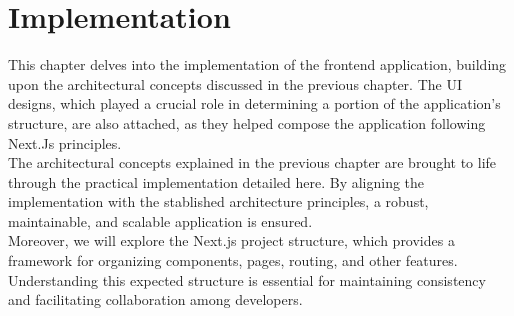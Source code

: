 \documentclass[./memory.tex]{subfiles}
\begin{document}
\chapter{Implementation}
This chapter delves into the implementation of the frontend application,
building upon the architectural concepts discussed in the previous chapter. The
UI designs, which played a crucial role in determining a portion of the
application's structure, are also attached, as they helped compose the
application following Next.Js principles.
\\[8pt]
The architectural concepts explained in the previous chapter are brought to life
through the practical implementation detailed here. By aligning the
implementation with the stablished architecture principles, a robust,
maintainable, and scalable application is ensured.
\\[8pt]
Moreover, we will explore the Next.js project structure, which provides a
framework for organizing components, pages, routing, and other features.
Understanding this expected structure is essential for maintaining consistency
and facilitating collaboration among developers.
\end{document}
